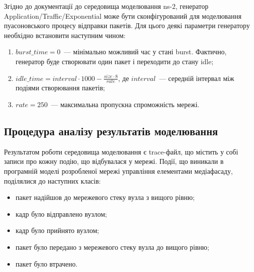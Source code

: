 \documentclass[a4paper,ukrainian,utf8,nocolumnsxix,nocolumnxxxii,nocolumnxxxi,floatsection,equationsection]{eskdtext}
\begin{document}
Згідно до документації до середовища моделювання ns-2, генератор Application/Traffic/Exponential може бути сконфігурований для моделювання пуасоновського процесу відправки пакетів. Для цього деякі параметри генератору необхідно встановити наступним чином:
\begin{enumerate}
	\item $burst\_time = 0$~--- мінімально можливий час у стані burst. Фактично, генератор буде створювати один пакет і переходити до стану idle;
	\item $idle\_time = interval\cdot1000 - \frac{size \cdot 8}{rate}$, де $interval$~--- середній інтервал між подіями створювання пакетів;
	\item $rate = 250$~--- максимальна пропускна спроможність мережі.
\end{enumerate}

\subsection{Процедура аналізу результатів моделювання}

Результатом роботи середовища моделювання є trace-файл, що містить у собі записи про кожну подію, що відбувалася у мережі. Події, що виникали в програмній моделі розробленої мережі управління елементами медіафасаду, поділялися до наступних класів:
\begin{itemize}
	\item пакет надійшов до мережевого стеку вузла з вищого рівню;
	\item кадр було відправлено вузлом;
	\item кадр було прийнято вузлом;
	\item пакет було передано з мережевого стеку вузла до вищого рівню;
	\item пакет було втрачено.
\end{itemize}
\end{document}
